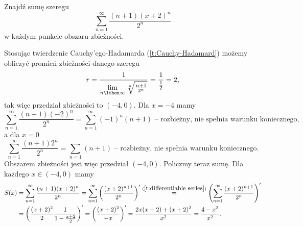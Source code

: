 \begin{example}
    Znajdź sumę szeregu
    \[ \sum_{n=1}^\infty\frac{(n+1)(x+2)^n}{2^n} \]
    w każdym punkcie obszaru zbieżności.
\end{example}
\begin{solution}
    Stosując twierdzenie Cauchy'ego-Hadamarda (\ref{t:Cauchy-Hadamard}) możemy obliczyć promień zbieżności danego szeregu
    \[ r = \frac{1}{\lim\limits_{n\lthen\infty}\sqrt[n]{\frac{n+1}{2^n}}} = \frac{1}{\frac{1}{2}} = 2, \]
    tak więc przedział zbieżności to $(-4, 0)$.
    Dla $x = -4$ mamy
    \[ \sum_{n=1}^\infty\frac{(n+1)(-2)^n}{2^n} = \sum_{n=1}^\infty(-1)^n(n+1) \text{ -- rozbieżny, nie spełnia warunku koniecznego}, \]
    a dla $x = 0$
    \[ \sum_{n=1}^\infty\frac{(n+1)2^n}{2^n} = \sum_{n=1}(n+1) \text{ -- rozbieżny, nie spełnia warunku koniecznego}. \]
    Obszarem zbieżności jest więc przedział $(-4, 0)$. Policzmy teraz sumę. Dla każdego $x \in (-4, 0)$ mamy
    \begin{align*}
        S(x) &= \sum_{n=1}^\infty\frac{(n+1)(x+2)^n}{2^n} = \sum_{n=1}^\infty \left(\frac{(x+2)^{n+1}}{2^n}\right)' \overset{(\ref{t:differentiable series})}{=} \left(\sum_{n=1}^\infty\frac{(x+2)^{n+1}}{2^n}\right)' \\
        &= \left(\frac{(x+2)^2}{2}\frac{1}{1 - \frac{x+2}{2}}\right)' = \left(\frac{(x+2)^2}{-x}\right)' = \frac{2x(x+2) + (x+2)^2}{x^2} = \frac{4 - x^2}{x^2}.
    \end{align*}
\end{solution}

